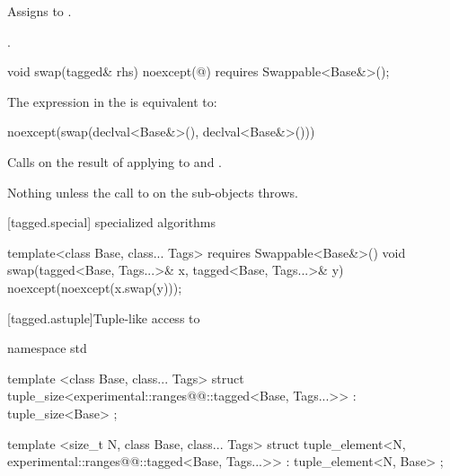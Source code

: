 {\begin{itemdescr}
\pnum
\effects Assigns  to .

\pnum
\returns {}.
\end{itemdescr}

\begin{itemdecl}
void swap(tagged& rhs) noexcept(@\seebelow@)
  requires Swappable<Base&>();
\end{itemdecl}

\begin{itemdescr}
\pnum
\remarks The expression in the  is equivalent to:

\begin{codeblock}
noexcept(swap(declval<Base&>(), declval<Base&>()))
\end{codeblock}

\pnum
\effects Calls  on the result of applying  to  and
.

\pnum
\throws Nothing unless the call to  on the  sub-objects throws.

\end{itemdescr}

[tagged.special]{ specialized algorithms}

%

\begin{itemdecl}
template<class Base, class... Tags>
  requires Swappable<Base&>()
void swap(tagged<Base, Tags...>& x, tagged<Base, Tags...>& y)
  noexcept(noexcept(x.swap(y)));
\end{itemdecl}

\begin{itemdescr}
\pnum
\effects {}
\end{itemdescr}

[tagged.astuple]{Tuple-like access to }

%
%
\begin{itemdecl}
namespace std {
  template <class Base, class... Tags>
  struct tuple_size<experimental::ranges@@::tagged<Base, Tags...>>
    : tuple_size<Base> { };

  template <size_t N, class Base, class... Tags>
  struct tuple_element<N, experimental::ranges@@::tagged<Base, Tags...>>
    : tuple_element<N, Base> { };
}
\end{itemdecl}

}
